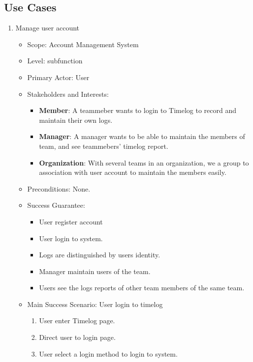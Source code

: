 \documentclass[12pt, a4paper]{article}
\begin{document}
\begin{CJK*}{UTF8}{bkai}
  \subsection{Use Cases}
    \begin{enumerate}
      \item Manage user account
        \begin{itemize}
          \item Scope: Account Management System
          \item Level: subfunction
          \item Primary Actor: User
          \item Stakeholders and Interests:
            \begin{itemize}
              \item {\bf Member}: A teammeber wants to login to Timelog to record and maintain their own logs.
              \item {\bf Manager}: A manager wants to be able to maintain the members of team, and see teammebers' timelog report.
              \item {\bf Organization}: With several teams in an organization, we a group to association with user account to maintain the members easily.
            \end{itemize}
          \item Preconditions: None.
          \item Success Guarantee:
            \begin{itemize}
              \item User register account
              \item User login to system.
              \item Logs are distinguished by users identity.
              \item Manager maintain users of the team.
              \item Users see the logs reports of other team members of the same team.
            \end{itemize}
          \item Main Success Scenario: User login to timelog
            \begin{enumerate}
              \item User enter Timelog page.
              \item Direct user to login page.
              \item User select a login method to login to system.
                \begin{itemize}

\end{itemize}
\end{enumerate}
\end{itemize}
\end{enumerate}
\end{CJK*}
\end{document}
